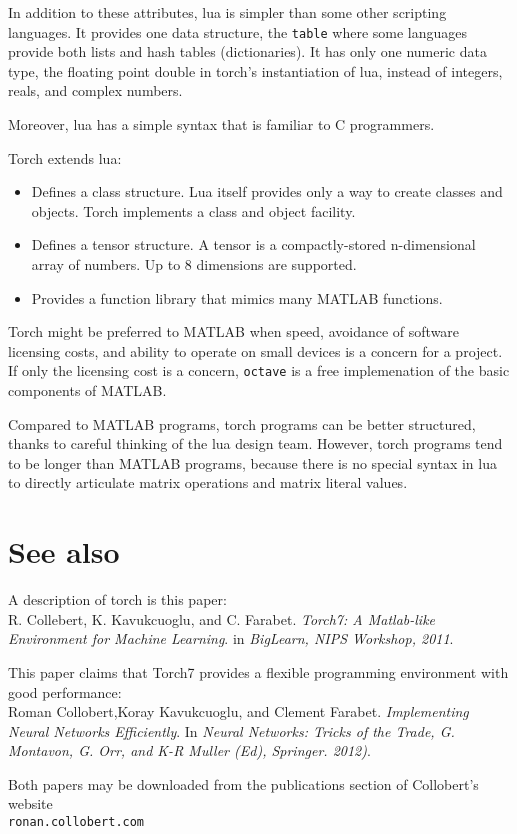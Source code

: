 \documentclass{article}
\let\code\texttt %
\begin{document}
In addition to these attributes, lua is simpler than some other
scripting languages. It provides one data structure, the \code{table}
where some languages provide both lists and hash tables (dictionaries).
It has only one numeric data type, the floating point double in torch's
instantiation of lua, instead of integers, reals, and complex numbers.

Moreover, lua has a simple syntax that is familiar to C programmers.

Torch extends lua:
\begin{itemize}
  \item Defines a class structure. Lua itself provides only a way to
    create classes and objects. Torch implements a class and object
    facility.
  \item Defines a tensor structure. A tensor is a compactly-stored
    n-dimensional array
    of numbers. Up to 8 dimensions are supported.
  \item Provides a function library that mimics many MATLAB functions. 
\end{itemize}


Torch might be preferred to MATLAB when speed, avoidance of software
licensing costs, and ability to operate on small devices is a concern
for a project. If only the licensing cost is a concern, \code{octave} is
a free implemenation of the basic components of MATLAB.

Compared to MATLAB programs, torch programs can be better structured,
thanks to careful thinking of the lua design team. However, torch
programs tend to be longer than MATLAB programs, because there is no
special syntax in lua to directly articulate matrix operations and
matrix literal values.




\section{See also}

A description of torch is this paper:\\
R. Collebert, K. Kavukcuoglu, and C. Farabet. \emph{Torch7: A
Matlab-like Environment for Machine Learning}. in \emph{BigLearn, NIPS
Workshop, 2011}.

This paper claims that Torch7 provides a flexible programming
environment with good performance:\\
Roman Collobert,Koray Kavukcuoglu, and Clement Farabet.
\emph{Implementing Neural Networks Efficiently}. In \emph{Neural
  Networks: Tricks of the Trade, G. Montavon, G. Orr, and K-R Muller
(Ed), Springer. 2012)}.

Both papers may be downloaded from the publications section of 
Collobert's website\\
\code{ronan.collobert.com}
\end{document}

